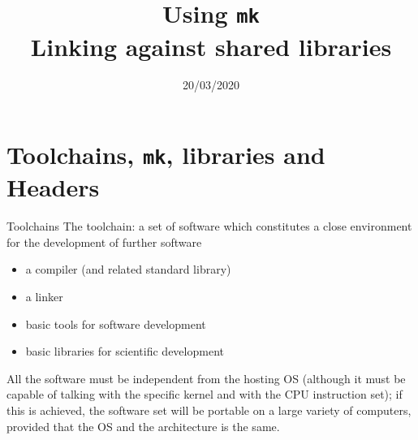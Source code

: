 \documentclass[10pt]{beamer}
\begin{document}
    
    \title{Using \texttt{mk}\\
        Linking against shared libraries}
    \date{20/03/2020}
    
    \begin{frame}
    \maketitle
\end{frame}

\section{Toolchains, \texttt{mk}, libraries and Headers}

\begin{frame}{Toolchains}
The toolchain: a set of software which constitutes a close environment for the development of further software

\begin{itemize}
    \item a compiler (and related standard library)
    \item a linker
    \item basic tools for software development
    \item basic libraries for scientific development
\end{itemize}	

All the software must be independent from the hosting OS 
(although it must be capable of talking with the specific kernel and with the CPU instruction set); if this is achieved, the software set will be portable on a large variety of computers, provided that the OS and the architecture is the same.

\end{frame}
\end{document}
